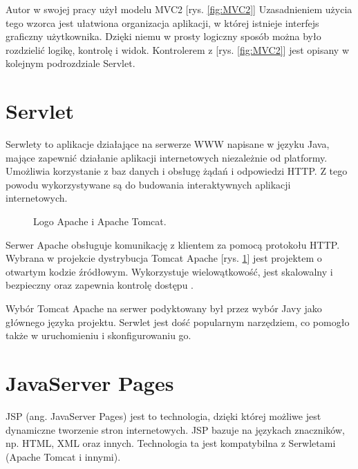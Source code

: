\documentclass[eng,printmode,oneside]{mgr}
\begin{document}
Autor w swojej pracy użył modelu MVC2 [rys. \ref{fig:MVC2}]
Uzasadnieniem użycia tego wzorca jest ułatwiona organizacja aplikacji, w której
istnieje interfejs graficzny użytkownika. Dzięki niemu w prosty logiczny sposób
można było rozdzielić logikę, kontrolę i widok. Kontrolerem z [rys.
\ref{fig:MVC2}] jest opisany w kolejnym podrozdziale Servlet.

\newpage
\section{Servlet}

Serwlety to aplikacje działające na serwerze WWW napisane w języku Java, mające
zapewnić działanie aplikacji internetowych niezależnie od
platformy.
Umożliwia korzystanie z baz danych i obsługę żądań i odpowiedzi HTTP. Z tego
powodu wykorzystywane są do budowania interaktywnych aplikacji internetowych.

\begin{figure}
\centering
{}
\caption{\label{fig:apache}Logo Apache i Apache Tomcat.}
\end{figure}

Serwer Apache obsługuje komunikację z klientem za pomocą protokołu HTTP. Wybrana
w projekcie dystrybucja Tomcat Apache [rys. \ref{fig:apache}] jest projektem o
otwartym kodzie źródłowym. Wykorzystuje wielowątkowość, jest skalowalny i
bezpieczny oraz zapewnia kontrolę dostępu \cite{apache.wiki}.

Wybór Tomcat Apache na serwer podyktowany był przez wybór Javy jako głównego
języka projektu. Serwlet jest dość popularnym narzędziem, co pomogło także w
uruchomieniu i skonfigurowaniu go.

\section{JavaServer Pages}

JSP (ang. JavaServer Pages) jest to technologia, dzięki której możliwe jest
dynamiczne tworzenie stron internetowych. JSP bazuje na językach znaczników,
np.
HTML, XML oraz innych. Technologia ta jest kompatybilna z Serwletami (Apache
Tomcat i innymi).
\end{document}
